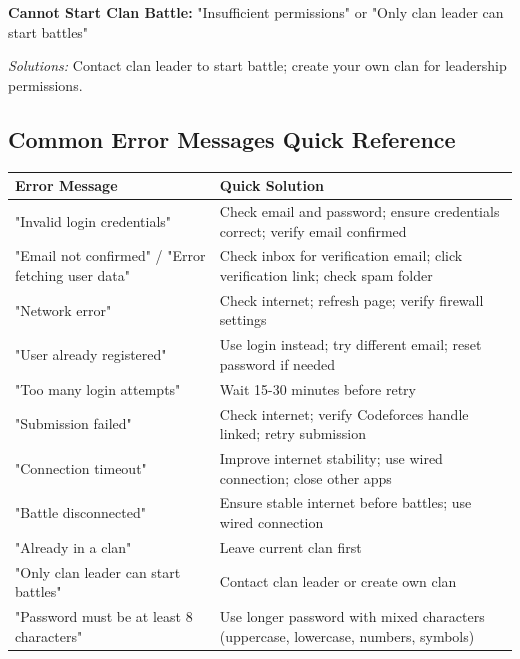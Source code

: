 \documentclass[12pt,a4paper]{article}
\begin{document}
\textbf{Cannot Start Clan Battle:} "Insufficient permissions" or "Only clan leader can start battles"

\textit{Solutions:} Contact clan leader to start battle; create your own clan for leadership permissions.

\subsection{Common Error Messages Quick Reference}

\begin{longtable}{|p{6cm}|p{8cm}|}
\hline
\textbf{Error Message} & \textbf{Quick Solution} \\
\hline
\endhead

"Invalid login credentials" & Check email and password; ensure credentials correct; verify email confirmed \\
\hline

"Email not confirmed" / "Error fetching user data" & Check inbox for verification email; click verification link; check spam folder \\
\hline

"Network error" & Check internet; refresh page; verify firewall settings \\
\hline

"User already registered" & Use login instead; try different email; reset password if needed \\
\hline

"Too many login attempts" & Wait 15-30 minutes before retry \\
\hline

"Submission failed" & Check internet; verify Codeforces handle linked; retry submission \\
\hline

"Connection timeout" & Improve internet stability; use wired connection; close other apps \\
\hline

"Battle disconnected" & Ensure stable internet before battles; use wired connection \\
\hline

"Already in a clan" & Leave current clan first \\
\hline

"Only clan leader can start battles" & Contact clan leader or create own clan \\
\hline

"Password must be at least 8 characters" & Use longer password with mixed characters (uppercase, lowercase, numbers, symbols) \\
\hline

\end{longtable}

\FloatBarrier

\end{document}
